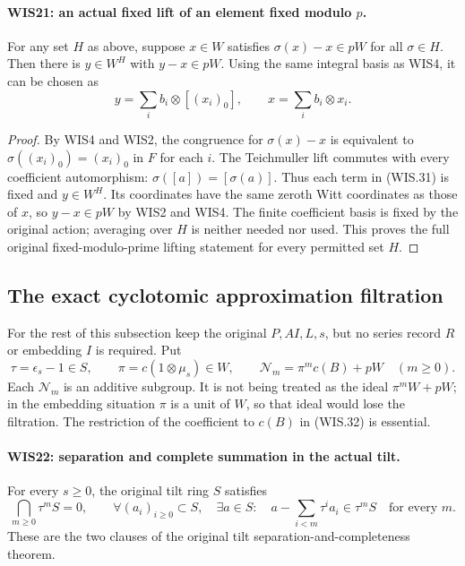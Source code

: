 \paragraph{WIS21: an actual fixed lift of an element fixed modulo $p$.}
\label{claim:WIS21}
For any set $H$ as above, suppose $x\in W$ satisfies
$\sigma(x)-x\in pW$ for all $\sigma\in H$.
Then there is $y\in W^H$ with $y-x\in pW$.
Using the same integral basis as WIS4, it can be chosen as
\[
            y=\sum_i b_i\otimes[(x_i)_0],
            \qquad x=\sum_i b_i\otimes x_i.                \tag{WIS.31}
\]

\begin{proof}
By WIS4 and WIS2, the congruence for $\sigma(x)-x$
is equivalent to
$\sigma((x_i)_0)=(x_i)_0$ in $F$ for each $i$.
The Teichmuller lift commutes with every coefficient
automorphism: $\sigma([a])=[\sigma(a)]$.
Thus each term in (WIS.31) is fixed and $y\in W^H$.
Its coordinates have the same zeroth Witt coordinates
as those of $x$, so $y-x\in pW$ by WIS2 and WIS4.
The finite coefficient basis is fixed by the original
action; averaging over $H$ is neither needed nor used.
This proves the full original fixed-modulo-prime
lifting statement for every permitted set $H$.
\end{proof}

\subsection{The exact cyclotomic approximation filtration}

For the rest of this subsection keep the original $P,AI,L,s$,
but no series record $R$ or embedding $I$ is required.
Put
\[
 \tau=\epsilon_s-1\in S,\qquad
 \pi=c(1\otimes\mu_s)\in W,\qquad
 \mathcal N_m=\pi^mc(B)+pW\quad(m\geq0).                    \tag{WIS.32}
\]
Each $\mathcal N_m$ is an additive subgroup. It is not being
treated as the ideal $\pi^mW+pW$; in the embedding situation
$\pi$ is a unit of $W$, so that ideal would lose the
filtration. The restriction of the coefficient to $c(B)$
in (WIS.32) is essential.

\paragraph{WIS22: separation and complete summation in the actual tilt.}
\label{claim:WIS22}
For every $s\geq0$, the original tilt ring $S$ satisfies
\[
 \bigcap_{m\geq0}\tau^mS=0,\qquad
 \forall(a_i)_{i\geq0}\subset S,\quad
 \exists a\in S:\quad
 a-\sum_{i<m}\tau^ia_i\in\tau^mS\quad\text{for every }m.
                                                               \tag{WIS.33}
\]
These are the two clauses of the original
tilt separation-and-completeness theorem.

